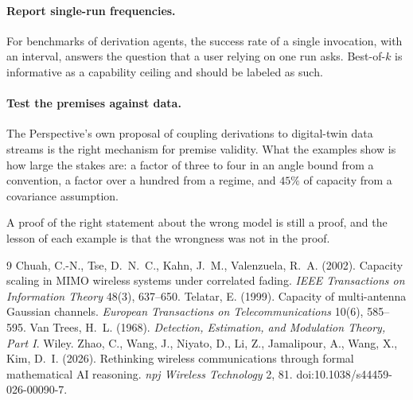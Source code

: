 \documentclass[11pt]{article}
\theoremstyle{definition}
\begin{document}
\paragraph{Report single-run frequencies.} For benchmarks of derivation agents, the success rate of a single invocation, with an interval, answers the question that a user relying on one run asks. Best-of-$k$ is informative as a capability ceiling and should be labeled as such.

\paragraph{Test the premises against data.} The Perspective's own proposal of coupling derivations to digital-twin data streams is the right mechanism for premise validity. What the examples show is how large the stakes are: a factor of three to four in an angle bound from a convention, a factor over a hundred from a regime, and $45\%$ of capacity from a covariance assumption.

A proof of the right statement about the wrong model is still a proof, and the lesson of each example is that the wrongness was not in the proof.

\begin{thebibliography}{9}
 Chuah, C.-N., Tse, D.~N.~C., Kahn, J.~M., Valenzuela, R.~A. (2002). Capacity scaling in MIMO wireless systems under correlated fading. \emph{IEEE Transactions on Information Theory} 48(3), 637--650.
 Telatar, E. (1999). Capacity of multi-antenna Gaussian channels. \emph{European Transactions on Telecommunications} 10(6), 585--595.
 Van Trees, H.~L. (1968). \emph{Detection, Estimation, and Modulation Theory, Part I}. Wiley.
 Zhao, C., Wang, J., Niyato, D., Li, Z., Jamalipour, A., Wang, X., Kim, D.~I. (2026). Rethinking wireless communications through formal mathematical AI reasoning. \emph{npj Wireless Technology} 2, 81. doi:10.1038/s44459-026-00090-7.
\end{thebibliography}
\end{document}
